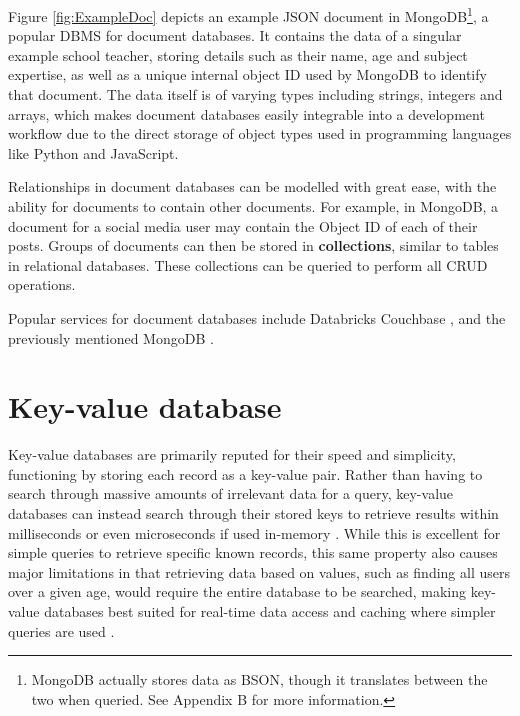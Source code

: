 \noindent Figure \ref{fig:ExampleDoc} depicts an example JSON document in MongoDB\footnote{MongoDB actually stores data as BSON, though it translates between the two when queried. See Appendix B for more information.}, a popular DBMS
for document databases. It contains the data of a singular example school teacher, storing details such as their name, age and subject expertise, as well as a unique internal object ID used by MongoDB to identify that document. The data itself is of varying types including 
strings, integers and arrays, which makes document databases easily integrable into a development workflow due to the direct 
storage of object types used in programming languages like Python and JavaScript.

\para Relationships in document databases can be modelled with great ease, with the ability for documents to contain other documents. 
For example, in MongoDB, a document for a social media user may contain the Object ID of each of their posts. Groups of documents can then
be stored in \textbf{collections}, similar to tables in relational databases. These collections can be queried to perform all CRUD operations. 


\para Popular services for document databases include Databricks \autocite{databricksDataAICompany2023} Couchbase \autocite{couchbaseCouchbaseBestFree}, and the previously mentioned MongoDB \autocite{mongodbDocumentDatabaseNoSQL}.


\section{Key-value database}
Key-value databases are primarily reputed for their speed and simplicity, functioning by storing each record as a key-value pair.
Rather than having to search through massive amounts of irrelevant data for a query, key-value databases can instead search 
through their stored keys to retrieve results within milliseconds or even microseconds if used in-memory \autocite{redisRedisFAQ}.
While this is excellent for simple queries to retrieve specific known records, this same property also causes major limitations in
that retrieving data based on values, such as finding all users over a given age, would require the entire database to be searched,
making key-value databases best suited for real-time data access and caching where simpler queries are used \autocite{mongodbWhatKeyValueDatabase}.

